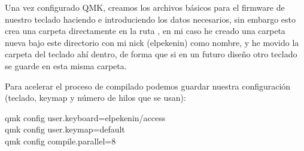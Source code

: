 Una vez configurado QMK, creamos los archivos básicos para el firmware de nuestro teclado haciendo  e introduciendo los datos necesarios, sin embargo esto crea una carpeta directamente en la ruta , en mi caso he creado una carpeta nueva bajo este directorio con mi nick (elpekenin) como nombre, y he movido la carpeta del teclado ahí dentro, de forma que si en un futuro diseño otro teclado se guarde en esta misma carpeta.

Para acelerar el proceso de compilado podemos guardar nuestra configuración (teclado, keymap y número de hilos que se usan):
\begin{multicli}
    \cliarrow qmk config user.keyboard=elpekenin/access  \\
    \cliarrow qmk config user.keymap=default \\
    \cliarrow qmk config compile.parallel=8
\end{multicli}
